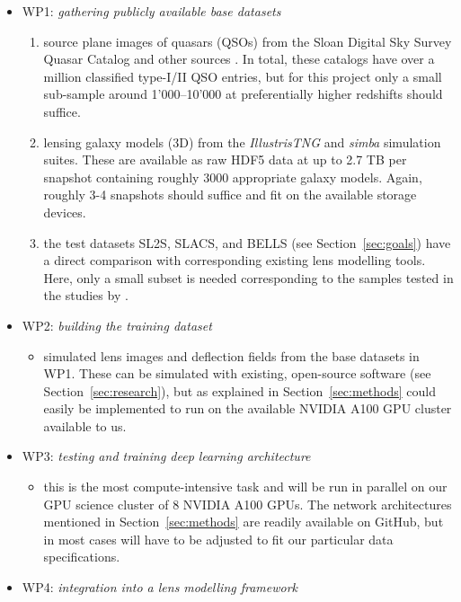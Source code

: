 \documentclass[a4paper,10pt]{article}
\begin{document}
\begin{itemize}[leftmargin=*, noitemsep]
\item WP1: \emph{gathering publicly available base datasets}
\begin{enumerate}[leftmargin=*]
\item source plane images of quasars (QSOs) from the Sloan Digital Sky
Survey Quasar Catalog \citep{Schneider10,Paris18} and other
sources \citep{Flesch21}. In total, these catalogs have over a
million classified type-I/II QSO entries, but for this project
only a small sub-sample around 1'000--10'000 at preferentially
higher redshifts should suffice.
\item lensing galaxy models (3D) from the \emph{IllustrisTNG}
\citep{Nelson18} and \emph{simba} \citep{Dave19} simulation
suites.  These are available as raw HDF5 data at up to 2.7 TB per
snapshot containing roughly 3000 appropriate galaxy models. Again,
roughly 3-4 snapshots should suffice and fit on the available
storage devices.
\item the test datasets SL2S, SLACS, and BELLS (see
Section~\ref{sec:goals}) have a direct comparison with
corresponding existing lens modelling tools. Here, only a small
subset is needed corresponding to the samples tested in the
studies by \cite{Adam22,Denzel21,Morningstar19,Hezaveh17}.
\end{enumerate}
\item WP2: \emph{building the training dataset}
\begin{itemize}[leftmargin=*]
\item simulated lens images and deflection fields from the base datasets
in WP1. These can be simulated with existing, open-source software
(see Section~\ref{sec:research}), but as explained in
Section~\ref{sec:methods} could easily be implemented
to run on the available NVIDIA A100 GPU cluster available to us.
\end{itemize}
\item WP3: \emph{testing and training deep learning architecture}
\begin{itemize}[leftmargin=*]
\item this is the most compute-intensive task and will be run in parallel
on our GPU science cluster of 8 NVIDIA A100 GPUs. The network
architectures mentioned in Section~\ref{sec:methods} are
readily available on GitHub, but in most cases will have to be
adjusted to fit our particular data specifications.
\end{itemize}
\item WP4: \emph{integration into a lens modelling framework}

\end{itemize}
\end{document}
